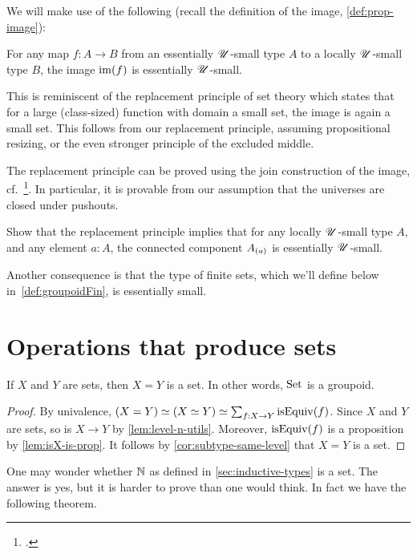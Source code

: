We will make use of the following (recall the definition of the image, \cref{def:prop-image}):
\begin{principle}[Replacement]
  \label{pri:replacement}
  For any map $f : A \to B$
  from an essentially ${\mathscr{U}}$-small type $A$
  to a locally ${\mathscr{U}}$-small type $B$,
  the image $\im(f)$ is essentially ${\mathscr{U}}$-small.
\end{principle}
This is reminiscent of the replacement principle of set theory which states
that for a large (class-sized) function with domain a small set,
the image is again a small set.
This follows from our replacement principle,
assuming propositional resizing, or the even stronger principle of the excluded middle.

The replacement principle can be proved using the join construction of the image, cf.~\citeauthor{Rijke-Join}\footcite{Rijke-Join}.
In particular, it is provable from our assumption that the universes
are closed under pushouts.
\begin{xca}\label{xca:comp-loc-small-ess-small}
  Show that the replacement principle implies that for any locally ${\mathscr{U}}$-small type $A$,
  and any element $a:A$,
  the connected component ${{A}_{\left(a\right)}}$ is essentially ${\mathscr{U}}$-small.
\end{xca}
Another consequence is that the type of finite sets, which we'll define below
in~\cref{def:groupoidFin}, is essentially small.

\section{Operations that produce sets}
\label{sec:operations-on-sets}

\begin{lemma}\label{lem:Set-is-groupoid}
If $X$ and $Y$ are sets, then $X=Y$ is a set. 
In other words, $\mathrm{Set}$ is a groupoid.
\end{lemma}

\begin{proof}
By univalence, $(X=Y) \equiv (X\equiv Y) \jdeq
\sum_{f:X\to Y} \isEq(f)$. Since $X$ and $Y$ are sets,
so is $X\to Y$ by \cref{lem:level-n-utils}. Moreover,
$\isEq(f)$ is a proposition by \cref{lem:isX-is-prop}.
It follows by \cref{cor:subtype-same-level} that $X=Y$ is a set.  
\end{proof}

One may wonder whether $\mathbb{N}$ as defined in \cref{sec:inductive-types}
is a set. The answer is yes, but it is harder to prove than one
would think. In fact we have the following theorem.

